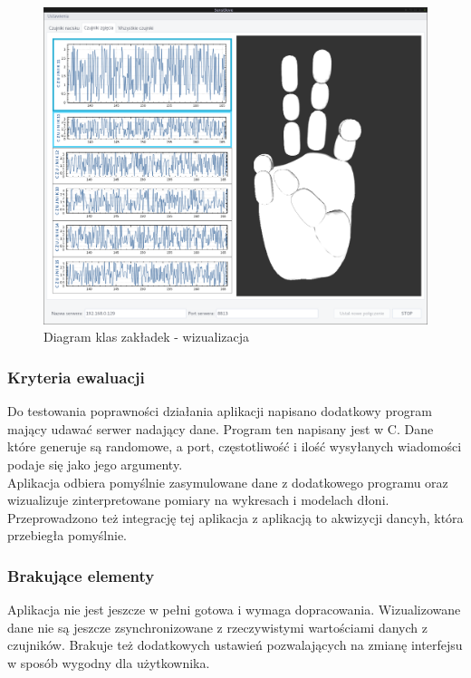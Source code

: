 ﻿\documentclass{article}
\begin{document}
\begin{figure}[H]
    \centering
    \includegraphics[width=18cm]{zakladka2.png}
    \caption{Diagram klas zakładek - wizualizacja}
    \label{rys:zakladka2}
\end{figure}

\subsubsection{Kryteria ewaluacji}
Do testowania poprawności działania aplikacji napisano dodatkowy program mający udawać serwer nadający dane. Program ten napisany jest w C. Dane które generuje są randomowe, a port, częstotliwość i ilość wysyłanych wiadomości podaje się jako jego argumenty.\\
Aplikacja odbiera pomyślnie zasymulowane dane z dodatkowego programu oraz wizualizuje zinterpretowane pomiary na wykresach i modelach dłoni. Przeprowadzono też integrację tej aplikacja z aplikacją to akwizycji dancyh, która przebiegła pomyślnie.

\subsubsection{Brakujące elementy}
Aplikacja nie jest jeszcze w pełni gotowa i wymaga dopracowania. Wizualizowane dane nie są jeszcze zsynchronizowane z rzeczywistymi wartościami danych z czujników. Brakuje też dodatkowych ustawień pozwalających na zmianę interfejsu w sposób wygodny dla użytkownika.
\end{document}
